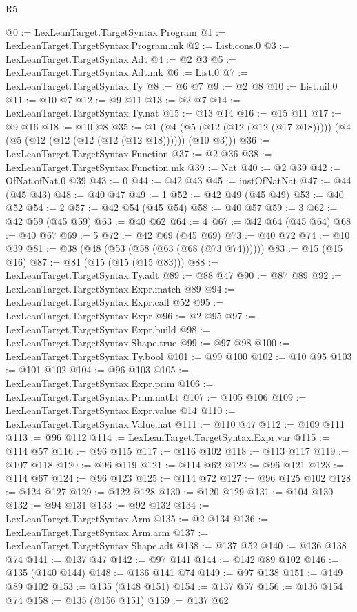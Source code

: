 \begin{lexlean}{R5}
\begin{coremodule}
@0 := LexLeanTarget.TargetSyntax.Program
@1 := LexLeanTarget.TargetSyntax.Program.mk
@2 := List.cons.{0}
@3 := LexLeanTarget.TargetSyntax.Adt
@4 := @2 @3
@5 := LexLeanTarget.TargetSyntax.Adt.mk
@6 := List.{0}
@7 := LexLeanTarget.TargetSyntax.Ty
@8 := @6 @7
@9 := @2 @8
@10 := List.nil.{0}
@11 := @10 @7
@12 := @9 @11
@13 := @2 @7
@14 := LexLeanTarget.TargetSyntax.Ty.nat
@15 := @13 @14
@16 := @15 @11
@17 := @9 @16
@18 := @10 @8
@35 := @1 (@4 (@5 (@12 (@12 (@12 (@17 @18))))) (@4 (@5 (@12 (@12 (@12 (@12 (@12 @18)))))) (@10 @3)))
@36 := LexLeanTarget.TargetSyntax.Function
@37 := @2 @36
@38 := LexLeanTarget.TargetSyntax.Function.mk
@39 := Nat
@40 := @2 @39
@42 := OfNat.ofNat.{0} @39
@43 := 0
@44 := @42 @43
@45 := instOfNatNat
@47 := @44 (@45 @43)
@48 := @40 @47
@49 := 1
@52 := @42 @49 (@45 @49)
@53 := @40 @52
@54 := 2
@57 := @42 @54 (@45 @54)
@58 := @40 @57
@59 := 3
@62 := @42 @59 (@45 @59)
@63 := @40 @62
@64 := 4
@67 := @42 @64 (@45 @64)
@68 := @40 @67
@69 := 5
@72 := @42 @69 (@45 @69)
@73 := @40 @72
@74 := @10 @39
@81 := @38 (@48 (@53 (@58 (@63 (@68 (@73 @74))))))
@83 := @15 (@15 @16)
@87 := @81 (@15 (@15 (@15 @83)))
@88 := LexLeanTarget.TargetSyntax.Ty.adt
@89 := @88 @47
@90 := @87 @89
@92 := LexLeanTarget.TargetSyntax.Expr.match @89
@94 := LexLeanTarget.TargetSyntax.Expr.call @52
@95 := LexLeanTarget.TargetSyntax.Expr
@96 := @2 @95
@97 := LexLeanTarget.TargetSyntax.Expr.build
@98 := LexLeanTarget.TargetSyntax.Shape.true
@99 := @97 @98
@100 := LexLeanTarget.TargetSyntax.Ty.bool
@101 := @99 @100
@102 := @10 @95
@103 := @101 @102
@104 := @96 @103
@105 := LexLeanTarget.TargetSyntax.Expr.prim
@106 := LexLeanTarget.TargetSyntax.Prim.natLt
@107 := @105 @106
@109 := LexLeanTarget.TargetSyntax.Expr.value @14
@110 := LexLeanTarget.TargetSyntax.Value.nat
@111 := @110 @47
@112 := @109 @111
@113 := @96 @112
@114 := LexLeanTarget.TargetSyntax.Expr.var
@115 := @114 @57
@116 := @96 @115
@117 := @116 @102
@118 := @113 @117
@119 := @107 @118
@120 := @96 @119
@121 := @114 @62
@122 := @96 @121
@123 := @114 @67
@124 := @96 @123
@125 := @114 @72
@127 := @96 @125 @102
@128 := @124 @127
@129 := @122 @128
@130 := @120 @129
@131 := @104 @130
@132 := @94 @131
@133 := @92 @132
@134 := LexLeanTarget.TargetSyntax.Arm
@135 := @2 @134
@136 := LexLeanTarget.TargetSyntax.Arm.arm
@137 := LexLeanTarget.TargetSyntax.Shape.adt
@138 := @137 @52
@140 := @136 @138 @74
@141 := @137 @47
@142 := @97 @141
@144 := @142 @89 @102
@146 := @135 (@140 @144)
@148 := @136 @141 @74
@149 := @97 @138
@151 := @149 @89 @102
@153 := @135 (@148 @151)
@154 := @137 @57
@156 := @136 @154 @74
@158 := @135 (@156 @151)
@159 := @137 @62

\end{coremodule}
\end{lexlean}
